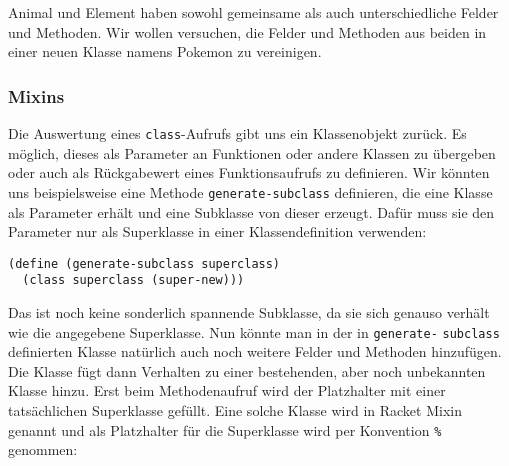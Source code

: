 Animal und Element haben sowohl gemeinsame als auch unterschiedliche Felder und Methoden. Wir wollen versuchen, die Felder und Methoden aus beiden in einer neuen Klasse namens Pokemon zu vereinigen. 



\subsubsection{Mixins}
Die Auswertung eines \texttt{class}-Aufrufs gibt uns ein Klassenobjekt zurück. Es möglich, dieses als Parameter an Funktionen oder andere Klassen zu übergeben oder auch als Rückgabewert eines Funktionsaufrufs zu definieren. Wir könnten uns beispielsweise eine Methode \texttt{generate-subclass} definieren, die eine Klasse als Parameter erhält und eine Subklasse von dieser erzeugt. Dafür muss sie den Parameter nur als Superklasse in einer Klassendefinition verwenden:

\begin{lstlisting}
(define (generate-subclass superclass)
  (class superclass (super-new)))
\end{lstlisting} 

Das ist noch keine sonderlich spannende Subklasse, da sie sich genauso verhält wie die angegebene Superklasse.
% 
% 
% 
% 
% 
Nun könnte man in der in \texttt{generate-} \texttt{subclass} definierten Klasse natürlich auch noch weitere Felder und Methoden hinzufügen. Die Klasse fügt dann Verhalten zu einer bestehenden, aber noch unbekannten Klasse hinzu. Erst beim Methodenaufruf wird der Platzhalter mit einer tatsächlichen Superklasse gefüllt. Eine solche Klasse wird in Racket Mixin genannt und als Platzhalter für die Superklasse wird per Konvention \texttt{\%} genommen:

